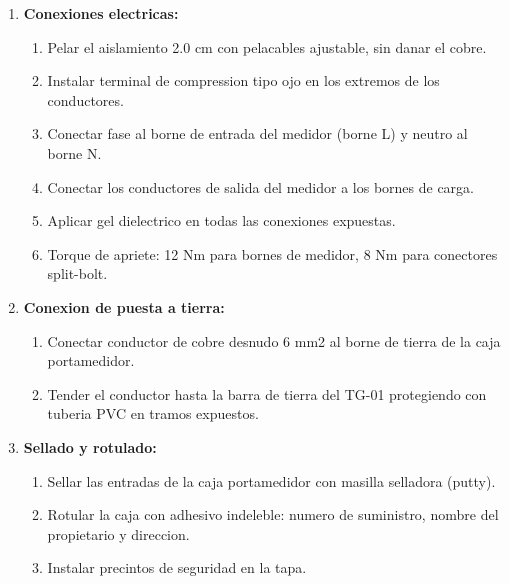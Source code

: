 \begin{enumerate}
  \begin{enumerate}
    \item Pasar guia de alambre galvanizado calibre 14 a traves de la tuberia.
    \item Fijar los conductores de fase (negro) y neutro (blanco) de 10 mm2 a la guia.
    \item Halar suavemente los conductores, evitando tirones bruscos que puedan danar el aislamiento.
    \item Dejar 0.50 m de conductor en cada extremo para conexiones.
  \end{enumerate}
  \item \textbf{Conexiones electricas:}
  \begin{enumerate}
    \item Pelar el aislamiento 2.0 cm con pelacables ajustable, sin danar el cobre.
    \item Instalar terminal de compression tipo ojo en los extremos de los conductores.
    \item Conectar fase al borne de entrada del medidor (borne L) y neutro al borne N.
    \item Conectar los conductores de salida del medidor a los bornes de carga.
    \item Aplicar gel dielectrico en todas las conexiones expuestas.
    \item Torque de apriete: 12 Nm para bornes de medidor, 8 Nm para conectores split-bolt.
  \end{enumerate}
  \item \textbf{Conexion de puesta a tierra:}
  \begin{enumerate}
    \item Conectar conductor de cobre desnudo 6 mm2 al borne de tierra de la caja portamedidor.
    \item Tender el conductor hasta la barra de tierra del TG-01 protegiendo con tuberia PVC en tramos expuestos.
  \end{enumerate}
  \item \textbf{Sellado y rotulado:}
  \begin{enumerate}
    \item Sellar las entradas de la caja portamedidor con masilla selladora (putty).
    \item Rotular la caja con adhesivo indeleble: numero de suministro, nombre del propietario y direccion.
    \item Instalar precintos de seguridad en la tapa.
  \end{enumerate}
\end{enumerate}

